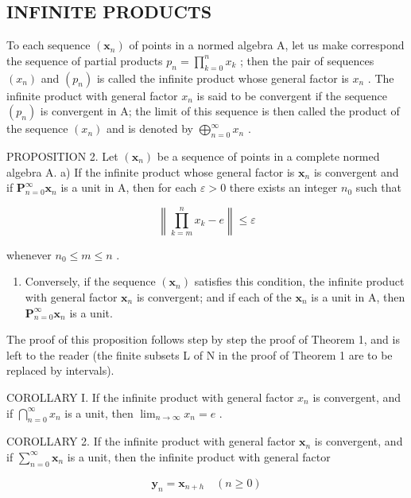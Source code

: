 \subsection{INFINITE PRODUCTS}

To each sequence \((\pmb{x}_n)\) of points in a normed algebra A, let us make correspond the sequence of partial products \(p_n = \prod_{k=0}^{n} x_k\) ; then the pair of sequences \((x_{n})\) and \((p_{n})\) is called the infinite product whose general factor is \(x_{n}\) . The infinite product with general factor \(x_{n}\) is said to be convergent if the sequence \((p_{n})\) is convergent in A; the limit of this sequence is then called the product of the sequence \((x_{n})\) and is denoted by \(\bigoplus_{n=0}^{\infty} x_{n}\) .

PROPOSITION 2. Let \((\pmb{x}_n)\) be a sequence of points in a complete normed algebra A. a) If the infinite product whose general factor is \(\pmb{x}_n\) is convergent and if \(\mathbf{P}_{n=0}^{\infty}\pmb{x}_n\) is a unit in A, then for each \(\varepsilon > 0\) there exists an integer \(n_0\) such that

\[
\left\| \prod_ {k = m} ^ {n} x _ {k} - e \right\| \leqslant \varepsilon
\]

whenever \(n_0 \leqslant m \leqslant n\) .

\begin{enumerate}
\def\labelenumi{\alph{enumi})}
\setcounter{enumi}{1}
\tightlist
\item
  Conversely, if the sequence \((\pmb{x}_n)\) satisfies this condition, the infinite product with general factor \(\pmb{x}_n\) is convergent; and if each of the \(\pmb{x}_n\) is a unit in A, then \(\mathbf{P}_{n=0}^{\infty}\pmb{x}_n\) is a unit.
\end{enumerate}

The proof of this proposition follows step by step the proof of Theorem 1, and is left to the reader (the finite subsets L of N in the proof of Theorem 1 are to be replaced by intervals).

COROLLARY I. If the infinite product with general factor \(x_{n}\) is convergent, and if \(\bigcap_{n=0}^{\infty}x_{n}\) is a unit, then \(\lim_{n\to\infty}x_{n}=e\) .

COROLLARY 2. If the infinite product with general factor \(\pmb{x}_n\) is convergent, and if \(\mathop{\sum }\limits_{{n = 0}}^{\infty}{\pmb{x}}_{n}\) is a unit, then the infinite product with general factor

\[
\mathbf {y} _ {n} = \mathbf {x} _ {n + h} \quad (n \geqslant 0)
\]

